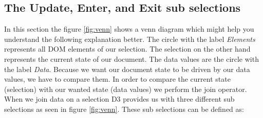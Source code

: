 \documentclass{bioinfo}
\begin{document}
\subsection{The Update, Enter, and Exit sub selections}
In this section the figure \ref{fig:venn} shows a venn diagram which might help you understand the following explanation better.
The circle with the label \textit{Elements} represents all DOM elements of our selection. The selection on the other hand represents the current state of our document.
The data values are the circle with the label \textit{Data}.
Because we want our document state to be driven by our data values, we have to compare them. 
In order to compare the current state (selection) with our wanted state (data values) we perform the join operator.
When we join data on a selection D3 provides us with three different sub selections as seen in figure \ref{fig:venn}.
These sub selections can be defined as:
\end{document}
